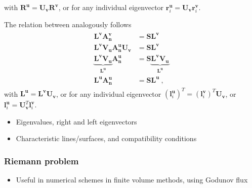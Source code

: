 \documentclass[letterpaper,10pt,english]{jupyterBook}
\begin{document}
\sphinxAtStartPar
with \(\mathbf{R}^{\mathbf{u}} = \mathbf{U}_{\mathbf{v}} \mathbf{R}^\mathbf{v}\), or for any individual eigenvector \(\mathbf{r}^\mathbf{u}_i = \mathbf{U}_{\mathbf{v}} \mathbf{r}^{\mathbf{v}}_i\).

\sphinxAtStartPar
The relation between  analogously follows
\begin{equation*}
\begin{split}\begin{aligned}
  \mathbf{L}^\mathbf{v} \mathbf{A}^{\mathbf{v}}_{\mathbf{n}} & = \mathbf{S} \mathbf{L}^\mathbf{v} \\
  \mathbf{L}^\mathbf{v} \mathbf{V}_{\mathbf{u}} \mathbf{A}^{\mathbf{u}}_{\mathbf{n}} \mathbf{U}_{\mathbf{v}} & = \mathbf{S} \mathbf{L}^\mathbf{v} \\
  \underbrace{\mathbf{L}^\mathbf{v} \mathbf{V}_{\mathbf{u}}}_{\mathbf{L}^\mathbf{u}} \mathbf{A}^{\mathbf{u}}_{\mathbf{n}} & = \mathbf{S} \underbrace{\mathbf{L}^\mathbf{v} \mathbf{V}_{\mathbf{u}}}_{\mathbf{L}^\mathbf{u}}  \\
  \mathbf{L}^\mathbf{u} \mathbf{A}^{\mathbf{u}}_{\mathbf{n}} & = \mathbf{S} \mathbf{L}^\mathbf{u}  \ ,
\end{aligned}\end{split}
\end{equation*}
\sphinxAtStartPar
with \(\mathbf{L}^{\mathbf{u}} = \mathbf{L}^\mathbf{v} \mathbf{U}_{\mathbf{v}}\), or for any individual eigenvector \(\left( \mathbf{l}^\mathbf{u}_i \right)^T = \left( \mathbf{l}^\mathbf{v}_i \right)^T \mathbf{U}_\mathbf{v}\), or \(\mathbf{l}^\mathbf{u}_i = \mathbf{U}_\mathbf{v}^T \mathbf{l}^\mathbf{v}_i\).
\begin{itemize}
\item {} 
\sphinxAtStartPar
Eigenvalues, right and left eigenvectors

\item {} 
\sphinxAtStartPar
Characteristic lines/surfaces, and compatibility conditions

\end{itemize}


\subsubsection{Riemann problem}
\label{\detokenize{ch/pde/hyperbolic-nd-draft:riemann-problem}}\label{\detokenize{ch/pde/hyperbolic-nd-draft:pde-hyperbolic-nd-draft-riemann}}\begin{itemize}
\item {} 
\sphinxAtStartPar
Useful in numerical schemes in finite volume methods, using Godunov flux

\end{itemize}
\end{document}
